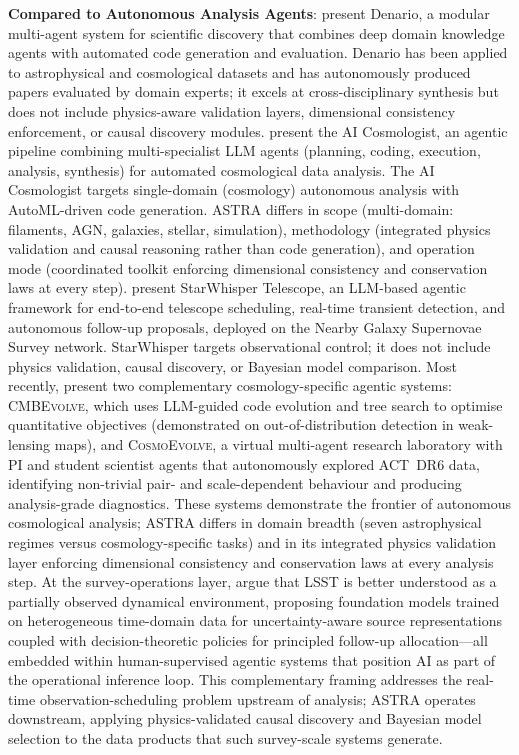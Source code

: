 \documentclass[usenatbib]{rasti}
\begin{document}
\textbf{Compared to Autonomous Analysis Agents}: \citet{villaescusanavarro2025denario} present Denario, a modular multi-agent system for scientific discovery that combines deep domain knowledge agents with automated code generation and evaluation. Denario has been applied to astrophysical and cosmological datasets and has autonomously produced papers evaluated by domain experts; it excels at cross-disciplinary synthesis but does not include physics-aware validation layers, dimensional consistency enforcement, or causal discovery modules. \citet{moss2025aicosmologist} present the AI Cosmologist, an agentic pipeline combining multi-specialist LLM agents (planning, coding, execution, analysis, synthesis) for automated cosmological data analysis. The AI Cosmologist targets single-domain (cosmology) autonomous analysis with AutoML-driven code generation. ASTRA differs in scope (multi-domain: filaments, AGN, galaxies, stellar, simulation), methodology (integrated physics validation and causal reasoning rather than code generation), and operation mode (coordinated toolkit enforcing dimensional consistency and conservation laws at every step). \citet{wang2025starwhisper} present StarWhisper Telescope, an LLM-based agentic framework for end-to-end telescope scheduling, real-time transient detection, and autonomous follow-up proposals, deployed on the Nearby Galaxy Supernovae Survey network. StarWhisper targets observational control; it does not include physics validation, causal discovery, or Bayesian model comparison. Most recently, \citet{xu2026cosmoevolve} present two complementary cosmology-specific agentic systems: \textsc{CMBEvolve}, which uses LLM-guided code evolution and tree search to optimise quantitative objectives (demonstrated on out-of-distribution detection in weak-lensing maps), and \textsc{CosmoEvolve}, a virtual multi-agent research laboratory with PI and student scientist agents that autonomously explored ACT~DR6 data, identifying non-trivial pair- and scale-dependent behaviour and producing analysis-grade diagnostics. These systems demonstrate the frontier of autonomous cosmological analysis; ASTRA differs in domain breadth (seven astrophysical regimes versus cosmology-specific tasks) and in its integrated physics validation layer enforcing dimensional consistency and conservation laws at every analysis step. At the survey-operations layer, \citet{bom2026lsstdecision} argue that LSST is better understood as a partially observed dynamical environment, proposing foundation models trained on heterogeneous time-domain data for uncertainty-aware source representations coupled with decision-theoretic policies for principled follow-up allocation---all embedded within human-supervised agentic systems that position AI as part of the operational inference loop. This complementary framing addresses the real-time observation-scheduling problem upstream of analysis; ASTRA operates downstream, applying physics-validated causal discovery and Bayesian model selection to the data products that such survey-scale systems generate.
\end{document}
